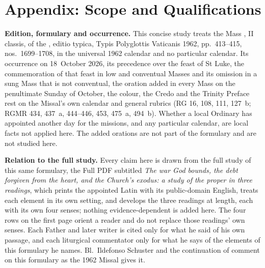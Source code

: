 
\section{Appendix: Scope and Qualifications}

{\footnotesize
\textbf{Edition, formulary and occurrence.} This concise study treats the Mass
, II classis, of the , editio typica, Typis Polyglottis Vaticanis 1962, pp.~413--415,
nos.~1699--1708, in the universal 1962 calendar and no particular calendar. Its
occurrence on 18~October 2026, its precedence over the feast of St Luke, the
commemoration of that feast in low and conventual Masses and its omission in a
sung Mass that is not conventual, the oration  added
in every Mass on the penultimate Sunday of October, the colour, the Credo and the
Trinity Preface rest on the Missal's own calendar and general rubrics (RG 16,
108, 111, 127~b; RGMR 434, 437~a, 444--446, 453, 475~a, 494~b). Whether a local
Ordinary has appointed another day for the missions, and any particular calendar,
are local facts not applied here. The added orations are not part of the
formulary and are not studied here.

\textbf{Relation to the full study.} Every claim here is drawn from the full
study of this same formulary, the Full PDF subtitled \textit{The war God bounds,
the debt forgiven from the heart, and the Church's exodus: a study of the proper
in three readings}, which prints the appointed Latin with its public-domain
English, treats each element in its own setting, and develops the three readings
at length, each with its own four senses; nothing evidence-dependent is added
here. The four rows on the first page orient a reader and do not replace those
readings' own senses. Each Father and later writer is cited only for what he said
of his own passage, and each liturgical commentator only for what he says of the
elements of this formulary he names. Bl.\ Ildefonso Schuster and the continuation of  comment
on this formulary as the 1962 Missal gives it.

}
